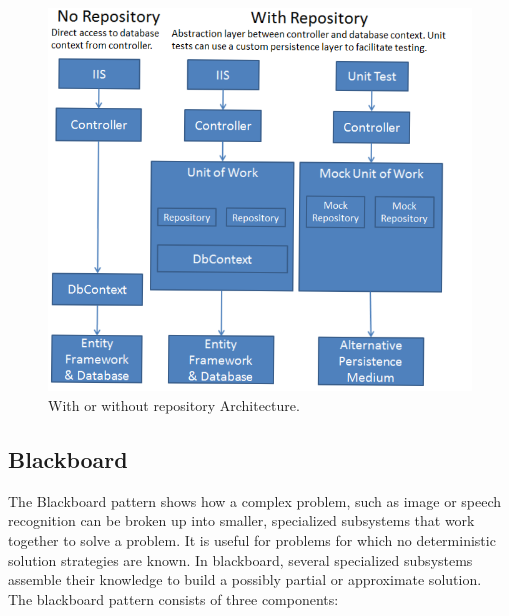 \documentclass{article}
\begin{document}
\begin{figure}[h]
\centering
\includegraphics[scale=0.55]{r.png}
\caption{With or without repository Architecture.}
\label{fig_r}
\end{figure}
	


\subsection{Blackboard}
The Blackboard pattern shows how a complex problem, such as image or speech recognition can be broken up into smaller, specialized subsystems that work together to solve a problem. It is useful for problems for which no deterministic solution strategies are known. In blackboard, several specialized subsystems assemble their knowledge to build a possibly partial or approximate solution.\\
The blackboard pattern consists of three components:
\end{document}

